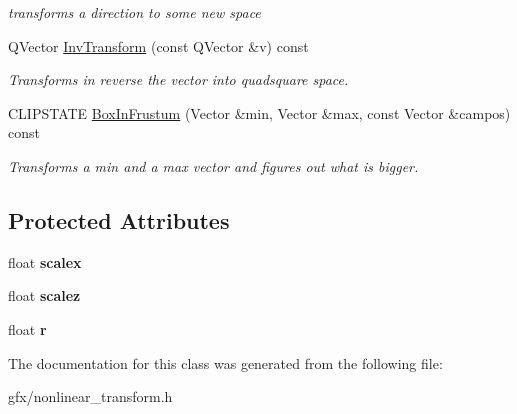 \begin{DoxyCompactItemize}
\begin{DoxyCompactList}\small\item\em transforms a direction to some new space \end{DoxyCompactList}\item 
Q\+Vector \hyperlink{classSphericalTransform_ac124a23ed1b5f3ec7f1278cd4ac1a3be}{Inv\+Transform} (const Q\+Vector \&v) const \hypertarget{classSphericalTransform_ac124a23ed1b5f3ec7f1278cd4ac1a3be}{}\label{classSphericalTransform_ac124a23ed1b5f3ec7f1278cd4ac1a3be}

\begin{DoxyCompactList}\small\item\em Transforms in reverse the vector into quadsquare space. \end{DoxyCompactList}\item 
C\+L\+I\+P\+S\+T\+A\+TE \hyperlink{classSphericalTransform_ae587ed700e27eb1a867c7396d7174ecf}{Box\+In\+Frustum} (Vector \&min, Vector \&max, const Vector \&campos) const \hypertarget{classSphericalTransform_ae587ed700e27eb1a867c7396d7174ecf}{}\label{classSphericalTransform_ae587ed700e27eb1a867c7396d7174ecf}

\begin{DoxyCompactList}\small\item\em Transforms a min and a max vector and figures out what is bigger. \end{DoxyCompactList}\end{DoxyCompactItemize}
\subsection*{Protected Attributes}
\begin{DoxyCompactItemize}
\item 
float {\bfseries scalex}\hypertarget{classSphericalTransform_a3f288f9a155a5fcecc032188ddd2bae4}{}\label{classSphericalTransform_a3f288f9a155a5fcecc032188ddd2bae4}

\item 
float {\bfseries scalez}\hypertarget{classSphericalTransform_af06dccb64dda85f427d1b8c96e31e1b7}{}\label{classSphericalTransform_af06dccb64dda85f427d1b8c96e31e1b7}

\item 
float {\bfseries r}\hypertarget{classSphericalTransform_ae2500d6e4e24cf896e3340af6e94642b}{}\label{classSphericalTransform_ae2500d6e4e24cf896e3340af6e94642b}

\end{DoxyCompactItemize}


The documentation for this class was generated from the following file\+:\begin{DoxyCompactItemize}
\item 
gfx/nonlinear\+\_\+transform.\+h\end{DoxyCompactItemize}
